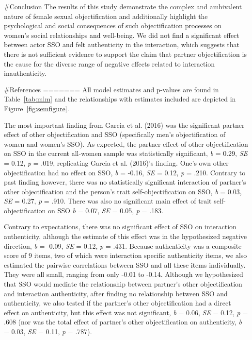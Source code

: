 \documentclass[
  man]{apa6}
\begin{document}
\#Conclusion
The results of this study demonstrate the complex and ambivalent nature of female sexual objectification and additionally highlight the psychological and social consequences of such objectification processes on women's social relationships and well-being. We did not find a significant effect between actor SSO and felt authenticity in the interaction, which suggests that there is not sufficient evidence to support the claim that partner objectification is the cause for the diverse range of negative effects related to interaction inauthenticity.

\#References
=======
All model estimates and p-values are found in Table~\ref{tab:mlm} and
the relationships with estimates included are depicted in
Figure~\ref{fig:semfigure}.

The most important finding from Garcia et al. (2016) was the significant
partner effect of other objectification and SSO (specifically men's
objectification of women and women's SSO). As expected, the partner
effect of other-objectification on SSO in the current all-women sample
was statistically significant, \emph{b} = 0.29, \emph{SE} = 0.12,
\emph{p} = .019, replicating Garcia et al. (2016)'s finding. One's own
other objectification had no effect on SSO, \emph{b} = -0.16, \emph{SE}
= 0.12, \emph{p} = .210. Contrary to past finding however, there was no
statistically significant interaction of partner's other objectification
and the person's trait self-objectification on SSO, \emph{b} = 0.03,
\emph{SE} = 0.27, \emph{p} = .910. There was also no significant main
effect of trait self-objectification on SSO \emph{b} = 0.07, \emph{SE} =
0.05, \emph{p} = .183.

Contrary to expectations, there was no significant effect of SSO on
interaction authenticity, although the estimate of this effect was in
the hypothesized negative direction, \emph{b} = -0.09, \emph{SE} = 0.12,
\emph{p} = .431. Because authenticity was a composite score of 9 items,
two of which were interaction specific authenticity items, we also
estimated the pairwise correlations between SSO and all these items
individually. They were all small, ranging from only -0.01 to -0.14.
Although we hypothesized that SSO would mediate the relationship between
partner's other objectification and interaction authenticity, after
finding no relationship between SSO and authenticity, we also tested if
the partner's other objectification had a direct effect on authenticity,
but this effect was not significant, \emph{b} = 0.06, \emph{SE} = 0.12,
\emph{p} = .608 (nor was the total effect of partner's other
objectification on authenticity, \emph{b} = 0.03, \emph{SE} = 0.11,
\emph{p} = .787).
\end{document}
